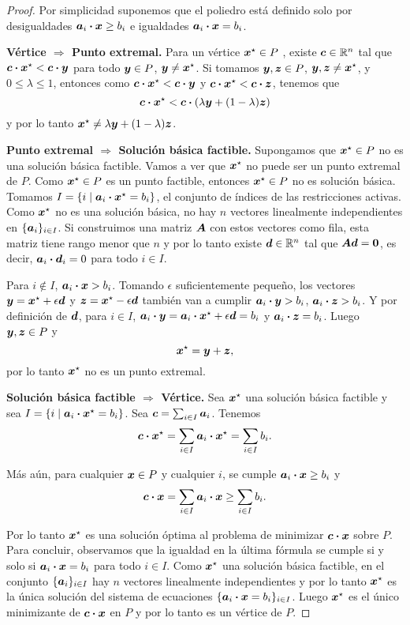 \begin{proof}
Por simplicidad suponemos que el poliedro está definido solo por desigualdades $\bm{a}_i \boldsymbol{\cdot} \bm{x} \ge b_i$ e igualdades $\bm{a}_i \boldsymbol{\cdot} \bm{x} = b_i$.

\textbf{Vértice $\Rightarrow$ Punto extremal.}
Para un vértice $\bm{x}^\star \in P$ , existe $\bm{c} \in \mathbb{R}^n$ tal que $\bm{c} \boldsymbol{\cdot} \bm{x}^\star < \bm{c} \boldsymbol{\cdot} \bm{y}$ para todo $\bm{y} \in P$, $\bm{y} \neq \bm{x}^\star$. Si tomamos $\bm{y}, \bm{z} \in P$, $\bm{y}, \bm{z} \neq \bm{x}^{\star}$, y $0 \le \lambda \le 1$, entonces como $\bm{c} \boldsymbol{\cdot} \bm{x}^{\star} < \bm{c} \boldsymbol{\cdot} \bm{y}$ y $\bm{c} \boldsymbol{\cdot} \bm{x}^{\star} < \bm{c} \boldsymbol{\cdot} \bm{z}$, tenemos que
$$
\bm{c} \boldsymbol{\cdot} \bm{x}^\star < \bm{c} \boldsymbol{\cdot} (\lambda \bm{y} + (1-\lambda) \bm{z})
$$
y por lo tanto $\bm{x}^\star \neq \lambda \bm{y} + (1-\lambda) \bm{z}$.

\textbf{Punto extremal $\Rightarrow$ Solución básica factible.}
Supongamos que $\bm{x}^{\star} \in P$ no es una solución básica factible. Vamos a ver que $\bm{x}^{\star}$ no puede ser un punto extremal de $P$. Como $\bm{x}^{\star} \in P$ es un punto factible, entonces $\bm{x}^{\star} \in P$ no es solución básica. Tomamos $I = \{i \mid \bm{a}_i \boldsymbol{\cdot} \bm{x}^{\star} = b_i\}$, el conjunto de índices de las restricciones activas. Como $\bm{x}^{\star}$ no es una solución básica, no hay $n$ vectores linealmente independientes en $\{\bm{a}_i\}_{i \in I}$. Si construimos una matriz $\bm{A}$ con estos vectores como fila, esta matriz tiene rango menor que $n$ y por lo tanto existe $\bm{d} \in \mathbb{R}^n$ tal que $\bm{A} \bm{d} = \bm{0}$, es decir, $\bm{a}_i \boldsymbol{\cdot} \bm{d}_i = 0$ para todo $i \in I$.

Para $i \not\in I$, $\bm{a}_i \boldsymbol{\cdot} \bm{x} > b_i$. Tomando $\epsilon$ suficientemente pequeño, los vectores $\bm{y} = \bm{x}^{\star} + \epsilon \bm{d}$ y $\bm{z} = \bm{x}^{\star} - \epsilon \bm{d}$ también van a cumplir $\bm{a}_i \boldsymbol{\cdot} \bm{y} > b_i$, $\bm{a}_i \boldsymbol{\cdot} \bm{z} > b_i$. Y por definición de $\bm{d}$, para $i \in I$, $\bm{a}_i \boldsymbol{\cdot} \bm{y} = \bm{a}_i \boldsymbol{\cdot} \bm{x}^{\star} + \epsilon \bm{d} = b_i$ y $\bm{a}_i \boldsymbol{\cdot} \bm{z} = b_i$. Luego $\bm{y}, \bm{z} \in P$ y
$$\bm{x}^{\star} = \bm{y} + \bm{z},$$
por lo tanto $\bm{x}^{\star}$ no es un punto extremal.

\textbf{Solución básica factible $\Rightarrow$ Vértice.}
Sea $\bm{x}^{\star}$ una solución básica factible y sea $I = \{i \mid \bm{a}_i \boldsymbol{\cdot} \bm{x}^{\star} = b_i\}$. Sea $\bm{c} = \sum_{i \in I} \bm{a}_i$. Tenemos
$$
\bm{c} \boldsymbol{\cdot} \bm{x}^{\star} =  \sum_{i \in I} \bm{a}_i \boldsymbol{\cdot} \bm{x}^{\star} = \sum_{i \in I} b_i.
$$

Más aún, para cualquier $\bm{x} \in P$ y cualquier $i$, se cumple $\bm{a}_i \boldsymbol{\cdot} \bm{x} \ge b_i$ y
$$
\bm{c} \boldsymbol{\cdot} \bm{x}=  \sum_{i \in I} \bm{a}_i \boldsymbol{\cdot} \bm{x} \ge \sum_{i \in I} b_i.
$$

Por lo tanto $\bm{x}^{\star}$ es una solución óptima al problema de minimizar $\bm{c} \boldsymbol{\cdot} \bm{x}$ sobre $P$. Para concluir, observamos que la igualdad en la última fórmula se cumple si y solo si $\bm{a}_i \boldsymbol{\cdot} \bm{x} = b_i$ para todo $i \in I$. Como $\bm{x}^{\star}$ una solución básica factible, en el conjunto $\{\bm{a}_i\}_{i \in I}$ hay $n$ vectores linealmente independientes y por lo tanto $\bm{x}^{\star}$ es la única solución del sistema de ecuaciones $\{\bm{a}_i \boldsymbol{\cdot} \bm{x} = b_i\}_{i \in I}$. Luego $\bm{x}^{\star}$ es el único minimizante de $\bm{c} \boldsymbol{\cdot} \bm{x}$ en $P$ y por lo tanto es un vértice de $P$.
\end{proof}


